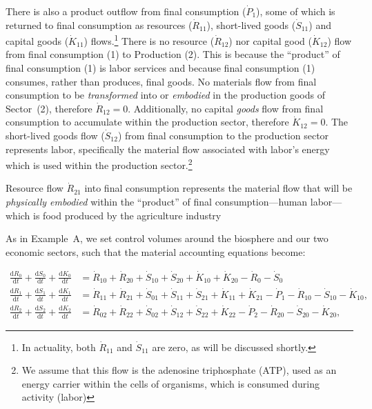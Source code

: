 There is also a product outflow 
from final consumption ($\dot{P}_{1}$), 
some of which is returned to final consumption
as resources ($\dot{R}_{11}$), 
short-lived goods ($\dot{S}_{11}$) 
and capital goods ($\dot{K}_{11}$) flows.\footnote{In actuality,
both $\dot{R}_{11}$ and $\dot{S}_{11}$
are zero,
as will be discussed shortly.
} 
There is no resource ($\dot{R}_{12}$) nor 
capital good ($\dot{K}_{12}$) flow from 
final consumption (1) to Production (2).
This is because the ``product'' of final consumption (1)
is labor services 
and because final consumption (1) consumes, 
rather than produces, final goods. 
No materials flow from final consumption to be 
\emph{transformed} into or \emph{embodied} 
in the production goods of Sector~(2), 
therefore $\dot{R}_{12} = 0$. 
Additionally, no capital \emph{goods} flow 
from final consumption to accumulate
within the production sector, 
therefore $\dot{K}_{12} = 0$.
The short-lived goods flow ($\dot{S}_{12}$)
from final consumption to the production sector 
represents labor,
specifically  the material flow 
associated with labor's energy 
which is used within the production sector.\footnote{We assume 
that this flow is the 
adenosine triphosphate (ATP), 
used as an energy
carrier within the cells of organisms,
which is consumed during activity (labor)} 

Resource flow $\dot{R}_{21}$ 
into final consumption represents 
the material flow that will be \emph{physically embodied} 
within the ``product'' of final consumption---human labor---which
is food produced by the agriculture industry

As in Example~A, 
we set control volumes around the biosphere 
and our two economic sectors, 
such that the material accounting equations become:

\begin{align} 
\label{eq:B_CV_0}
	\frac{\mathrm{d}R_{0}}{\mathrm{d}t} 
	+ \frac{\mathrm{d}S_{0}}{\mathrm{d}t}	
	+ \frac{\mathrm{d}K_0}{\mathrm{d}t}		&
	=  \dot{R}_{10} + \dot{R}_{20} 
	+ \dot{S}_{10} + \dot{S}_{20} 
	+ \dot{K}_{10} + \dot{K}_{20} 
	- \dot{R}_{0} 
	- \dot{S}_{0} 							\\
\label{eq:B_CV_1}
	\frac{\mathrm{d}R_{1}}{\mathrm{d}t} 
	+ \frac{\mathrm{d}S_{1}}{\mathrm{d}t}	
	+ \frac{\mathrm{d}K_{1}}{\mathrm{d}t}	&
	=  \dot{R}_{11} 
	+ \dot{R}_{21}
	+ \dot{S}_{01} 
	+ \dot{S}_{11} 
	+ \dot{S}_{21}
	+ \dot{K}_{11}
	+ \dot{K}_{21}
	- \dot{P}_{1} 
	- \dot{R}_{10} 
	- \dot{S}_{10} 
	- \dot{K}_{10},							\\
\label{eq:B_CV_2}
	\frac{\mathrm{d}R_{2}}{\mathrm{d}t} 
	+ \frac{\mathrm{d}S_{2}}{\mathrm{d}t}
	+ \frac{\mathrm{d}K_{2}}{\mathrm{d}t}	&
	=  \dot{R}_{02} 
	+ \dot{R}_{22} 
	+ \dot{S}_{02} 
	+ \dot{S}_{12} 
	+ \dot{S}_{22} 
	+ \dot{K}_{22}
	- \dot{P}_{2}
	- \dot{R}_{20} 
	- \dot{S}_{20} 
	- \dot{K}_{20},
\end{align}


